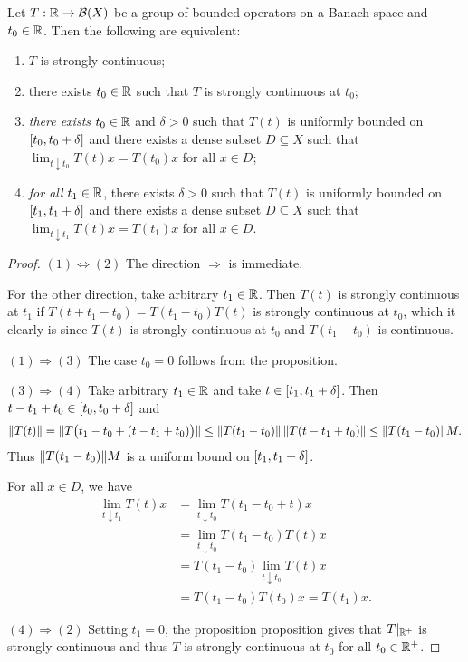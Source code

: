 \begin{corollary} \label{stronglyContinuousConditionGroupOfOperators}
Let $T:\mathbb{R}\to \operatorname{\mathcal{B}}(X)$ be a group of bounded operators on a Banach space and $t_0\in \mathbb{R}$. Then the following are equivalent:
\begin{enumerate}
\item $T$ is strongly continuous;
\item there exists $t_0\in \mathbb{R}$ such that $T$ is strongly continuous at $t_0$;
\item \emph{there exists} $t_0\in \mathbb{R}$ and $\delta > 0$ such that $T(t)$ is uniformly bounded on $\interval{t_0, t_0+\delta}$ and there exists a dense subset $D\subseteq X$ such that $\lim_{t\downarrow t_0} T(t)x = T(t_0)x$ for all $x\in D$;
\item \emph{for all} $t_1\in \mathbb{R}$, there exists $\delta > 0$ such that $T(t)$ is uniformly bounded on $\interval{t_1, t_1+\delta}$ and there exists a dense subset $D\subseteq X$ such that $\lim_{t\downarrow t_1} T(t)x = T(t_1)x$ for all $x\in D$.
\end{enumerate}
\end{corollary}
\begin{proof}
$(1) \Leftrightarrow (2)$ The direction $\Rightarrow$ is immediate.

For the other direction, take arbitrary $t_1\in \mathbb{R}$. Then $T(t)$ is strongly continuous at $t_1$ if $T(t+t_1-t_0) = T(t_1-t_0)T(t)$ is strongly continuous at $t_0$, which it clearly is since $T(t)$ is strongly continuous at $t_0$ and $T(t_1-t_0)$ is continuous. 

$(1) \Rightarrow (3)$ The case $t_0 = 0$ follows from the proposition.

$(3) \Rightarrow (4)$ Take arbitrary $t_1\in \mathbb{R}$ and take $t\in \interval{t_1, t_1+\delta}$. Then $t-t_1+t_0 \in \interval{t_0,t_0+\delta}$ and
\[ \lVert T(t)\rVert = \lVert T\big(t_1 - t_0 + (t-t_1+t_0)\big)\rVert \leq \lVert T(t_1 - t_0)\rVert\,\lVert T(t-t_1+t_0)\rVert \leq \lVert T(t_1-t_0)\rVert M. \]
Thus $\lVert T(t_1 - t_0)\rVert M$ is a uniform bound on $\interval{t_1, t_1+\delta}$.

For all $x\in D$, we have
\begin{align*}
\lim_{t\downarrow t_1} T(t)x &= \lim_{t\downarrow t_0} T(t_1 - t_0 + t)x \\
&= \lim_{t\downarrow t_0} T(t_1 - t_0)T(t)x \\
&= T(t_1-t_0)\lim_{t\downarrow t_0} T(t)x \\
&= T(t_1 - t_0)T(t_0)x = T(t_1)x.
\end{align*}

$(4) \Rightarrow (2)$ Setting $t_1 = 0$, the proposition proposition gives that $T|_{\mathbb{R}^+}$ is strongly continuous and thus $T$ is strongly continuous at $t_0$ for all $t_0\in \mathbb{R}^+$.
\end{proof}

